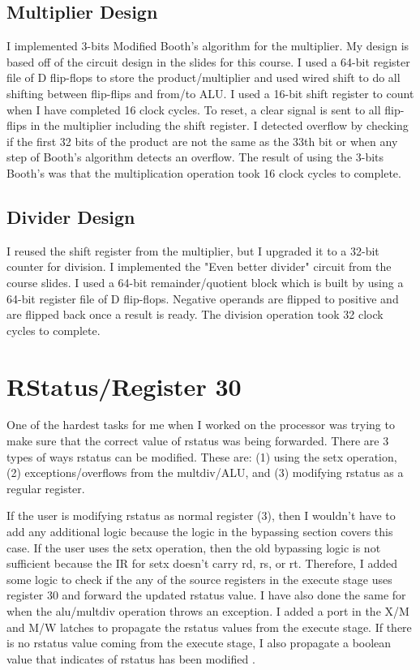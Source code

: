\documentclass[letterpaper]{article} %
\begin{document}
\subsection{Multiplier Design}
I implemented 3-bits Modified Booth's algorithm for the multiplier. My design is based off of the circuit design in the slides for this course. I used a 64-bit register file of D flip-flops to store the product/multiplier and used wired shift to do all shifting between flip-flips and from/to ALU. I used a 16-bit shift register to count when I have completed 16 clock cycles. To reset, a clear signal is sent to all flip-flips in the multiplier including the shift register. I detected overflow by checking if the first 32 bits of the product are not the same as the 33th bit or when any step of Booth's algorithm detects an overflow. The result of using the 3-bits Booth's was that the multiplication operation took 16 clock cycles to complete.

\subsection{Divider Design}
I reused the shift register from the multiplier, but I upgraded it to a 32-bit counter for division. I implemented the "Even better divider" circuit from the course slides. I used a 64-bit remainder/quotient block which is built by using a 64-bit register file of D flip-flops. Negative operands are flipped to positive and are flipped back once a result is ready. The division operation took 32 clock cycles to complete.

\section{RStatus/Register 30}
One of the hardest tasks for me when I worked on the processor was trying to make sure that the correct value of rstatus was being forwarded. There are 3 types of ways rstatus can be modified. These are: (1) using the setx operation, (2) exceptions/overflows from the multdiv/ALU, and (3) modifying rstatus as a regular register.

If the user is modifying rstatus as normal register (3), then I wouldn't have to add any additional logic because the logic in the bypassing section covers this case. If the user uses the setx operation, then the old bypassing logic is not sufficient because the IR for setx doesn't carry rd, rs, or rt. Therefore, I added some logic to check if the any of the source registers in the execute stage uses register 30 and forward the updated rstatus value. I have also done the same for when the alu/multdiv operation throws an exception. I added a port in the X/M and M/W latches to propagate the rstatus values from the execute stage. If there is no rstatus value coming from the execute stage, I also propagate a boolean value that indicates of rstatus has been modified .
\end{document}
